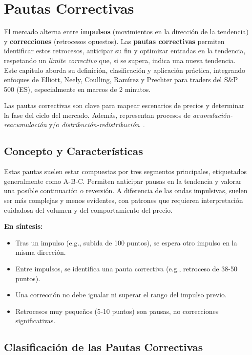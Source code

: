 \chapter{Pautas Correctivas}  %

El mercado alterna entre \textbf{impulsos} (movimientos en la direcci\'on de la tendencia) y \textbf{correcciones} (retrocesos opuestos). Las \textbf{pautas correctivas} permiten identificar estos retrocesos, anticipar su fin y optimizar entradas en la tendencia, respetando un \textit{l\'imite correctivo} que, si se supera, indica una nueva tendencia. Este cap\'itulo aborda su definici\'on, clasificaci\'on y aplicaci\'on pr\'actica, integrando enfoques de Elliott, Neely, Coulling, Ram\'irez y Prechter para traders del S\&P 500 (ES), especialmente en marcos de 2 minutos.

Las pautas correctivas son clave para mapear escenarios de precios y determinar la fase del ciclo del mercado. Adem\'as, representan procesos de \textit{acumulaci\'on-reacumulaci\'on} y/o \textit{distribuci\'on-redistribuci\'on}~\cite{ramirez18}.

\section{Concepto y Caracter\'isticas}

Estas pautas suelen estar compuestas por tres segmentos principales, etiquetados generalmente como A-B-C. Permiten anticipar pausas en la tendencia y valorar una posible continuaci\'on o reversi\'on. A diferencia de las ondas impulsivas, suelen ser m\'as complejas y menos evidentes, con patrones que requieren interpretaci\'on cuidadosa del volumen y del comportamiento del precio.

\textbf{En s\'intesis:}
\begin{itemize}
    \item Tras un impulso (e.g., subida de 100 puntos), se espera otro impulso en la misma direcci\'on.
    \item Entre impulsos, se identifica una pauta correctiva (e.g., retroceso de 38-50 puntos).
    \item Una correcci\'on no debe igualar ni superar el rango del impulso previo.
    \item Retrocesos muy peque\~nos (5-10 puntos) son pausas, no correcciones significativas.
\end{itemize}

\section{Clasificaci\'on de las Pautas Correctivas}

